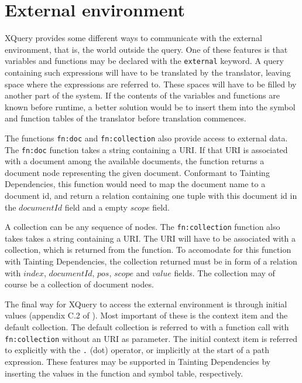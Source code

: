 \section{External environment}
\label{sect:disc:ctxItem}

XQuery provides some different ways to communicate with the external environment, that is, the world outside the
query. One of these features is that variables and functions may be declared with the \texttt{external} keyword. A
query containing such expressions will have to be translated by the translator, leaving space where the
expressions are referred to. These spaces will have to be filled by another
part of the system. If the contents of the variables and functions are known before runtime, a better solution would be to insert them into the symbol
and function tables of the translator before translation commences.

The functions \texttt{fn:doc} and \texttt{fn:collection} also provide access to external data. The \texttt{fn:doc}
function takes a string containing a URI. If that URI is associated with a document among the available documents,
the function returns a document node representing the given document. Conformant to Tainting Dependencies, this
function would need to map the document name to a document id, and return a relation containing one tuple with
this document id in the $documentId$ field and a empty $scope$ field.

A collection can be any sequence of nodes. The \texttt{fn:collection} function also takes takes a string
containing a URI. The URI will have to be associated with a collection, which is returned from the function. To
accomodate for this function with Tainting Dependencies, the collection returned must be in form of a relation
with $index$, $documentId$, $pos$, $scope$ and $value$ fields. The collection may of course be a collection of
document nodes.

The final way for XQuery to access the external environment is through initial values (appendix C.2 of
\cite{w3c00}). Most important of these is the context item and the default collection. The default collection is
referred to with a function call with \texttt{fn:collection} without an URI as parameter. The initial context item
is referred to explicitly with the \verb!.! (dot) operator, or implicitly at the start of a path expression. These
features may be supported in Tainting Dependencies by inserting the values in
the function and symbol table, respectively.